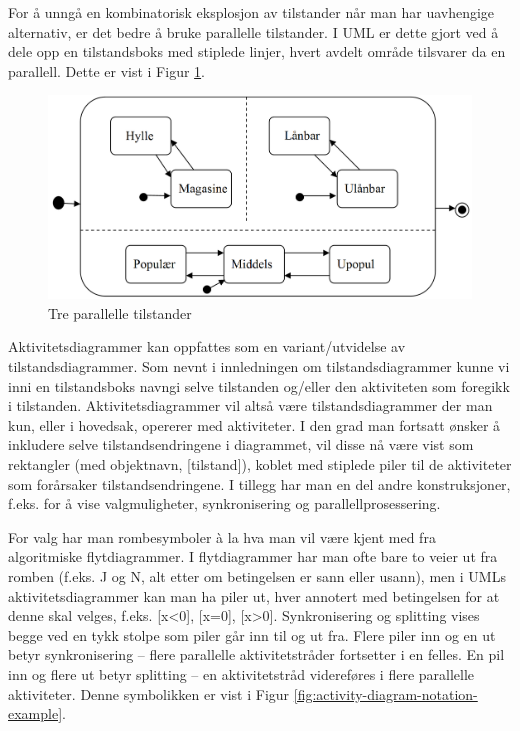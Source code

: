 For å unngå en kombinatorisk eksplosjon av tilstander når man har uavhengige alternativ, er det bedre å bruke parallelle tilstander. I UML er dette gjort ved å dele opp en tilstandsboks med stiplede linjer, hvert avdelt område tilsvarer da en parallell. Dette er vist i Figur \ref{fig:three-parallell-states-example}.

\begin{figure}[H]
    \centering
    \includegraphics[scale=0.35]{resources/three-parallell-states-example.PNG}
    \caption{Tre parallelle tilstander}
    \label{fig:three-parallell-states-example}
\end{figure}

Aktivitetsdiagrammer kan oppfattes som en variant/utvidelse av tilstandsdiagrammer. Som nevnt i innledningen om tilstandsdiagrammer kunne vi inni en tilstandsboks navngi selve tilstanden og/eller den aktiviteten som foregikk i tilstanden. Aktivitetsdiagrammer vil altså være tilstandsdiagrammer der man kun, eller i hovedsak, opererer med aktiviteter. I den grad man fortsatt ønsker å inkludere selve tilstandsendringene i diagrammet, vil disse nå være vist som rektangler (med objektnavn, [tilstand]), koblet med stiplede piler til de aktiviteter som forårsaker tilstandsendringene. I tillegg har man en del andre konstruksjoner, f.eks. for å vise valgmuligheter, synkronisering og parallellprosessering.

For valg har man rombesymboler à la hva man vil være kjent med fra algoritmiske flytdiagrammer. I flytdiagrammer har man ofte bare to veier ut fra romben (f.eks. J og N, alt etter om betingelsen er sann eller usann), men i UMLs aktivitetsdiagrammer kan man ha piler ut, hver annotert med betingelsen for at denne skal velges, f.eks. [x<0], [x=0], [x>0]. Synkronisering og splitting vises begge ved en tykk stolpe som piler går inn til og ut fra. Flere piler inn og en ut betyr synkronisering – flere parallelle aktivitetstråder fortsetter i en felles. En pil inn og flere ut betyr splitting – en aktivitetstråd videreføres i flere parallelle aktiviteter. Denne symbolikken er vist i Figur \ref{fig:activity-diagram-notation-example}.


